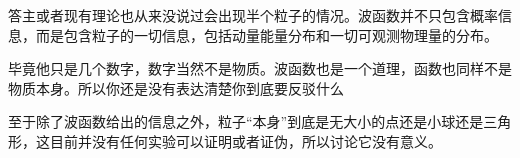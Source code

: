 \begin{itemize}
答主或者现有理论也从来没说过会出现半个粒子的情况。波函数并不只包含概率信息，而是包含粒子的一切信息，包括动量能量分布和一切可观测物理量的分布。

毕竟他只是几个数字，数字当然不是物质。波函数也是一个道理，函数也同样不是物质本身。所以你还是没有表达清楚你到底要反驳什么

至于除了波函数给出的信息之外，粒子“本身”到底是无大小的点还是小球还是三角形，这目前并没有任何实验可以证明或者证伪，所以讨论它没有意义。
\end{itemize}
